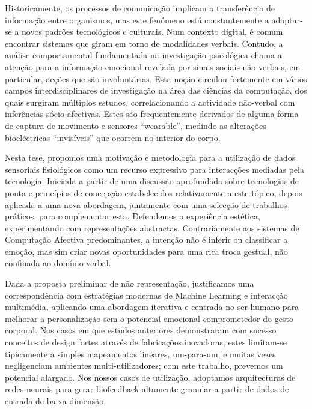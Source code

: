 

Historicamente, os processos de comunicação implicam a transferência de informação entre organismos, mas este fenómeno está constantemente a adaptar-se a novos padrões tecnológicos e culturais. Num contexto digital, é comum encontrar sistemas que giram em torno de modalidades verbais. Contudo, a análise comportamental fundamentada na investigação psicológica chama a atenção para a informação emocional revelada por sinais sociais não verbais, em particular, acções que são involuntárias. Esta noção circulou fortemente em vários campos interdisciplinares de investigação na área das ciências da computação, dos quais surgiram múltiplos estudos, correlacionando a actividade não-verbal com inferências sócio-afectivas. Estes são frequentemente derivados de alguma forma de captura de movimento e sensores ``wearable'', medindo as alterações bioeléctricas ``invisíveis'' que ocorrem no interior do corpo.

Nesta tese, propomos uma motivação e metodologia para a utilização de dados sensoriais fisiológicos como um recurso expressivo para interacções mediadas pela tecnologia. Iniciada a partir de uma discussão aprofundada sobre tecnologias de ponta e princípios de concepção estabelecidos relativamente a este tópico, depois aplicada a uma nova abordagem, juntamente com uma selecção de trabalhos práticos, para complementar esta. Defendemos a experiência estética, experimentando com representações abstractas. Contrariamente aos sistemas de Computação Afectiva predominantes, a intenção não é inferir ou classificar a emoção, mas sim criar novas oportunidades para uma rica troca gestual, não confinada ao domínio verbal.

Dada a proposta preliminar de não representação, justificamos uma correspondência com estratégias modernas de Machine Learning e interacção multimédia, aplicando uma abordagem iterativa e centrada no ser humano para melhorar a personalização sem o potencial emocional comprometedor do gesto corporal. Nos casos em que estudos anteriores demonstraram com sucesso conceitos de design fortes através de fabricações inovadoras, estes limitam-se tipicamente a simples mapeamentos lineares, um-para-um, e muitas vezes negligenciam ambientes multi-utilizadores; com este trabalho, prevemos um potencial alargado. Nos nossos casos de utilização, adoptamos arquitecturas de redes neurais para gerar biofeedback altamente granular a partir de dados de entrada de baixa dimensão.

